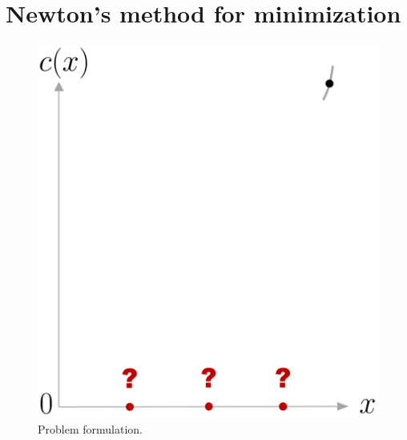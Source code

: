 \documentclass[10pt,a4paper]{article} %
\newcommand{\trsp}{{\scriptscriptstyle\top}}
\begin{document}


\newpage
\section{Newton's method for minimization}\label{sec:Newton}

\begin{figure}
\centering
\includegraphics[width=.26\textwidth]{images/NewtonMethod1D_problem01.png}
\caption{\footnotesize
Problem formulation.
}
\label{fig:NewtonProblem}
\vspace{20pt}
\end{figure}
\end{document}
